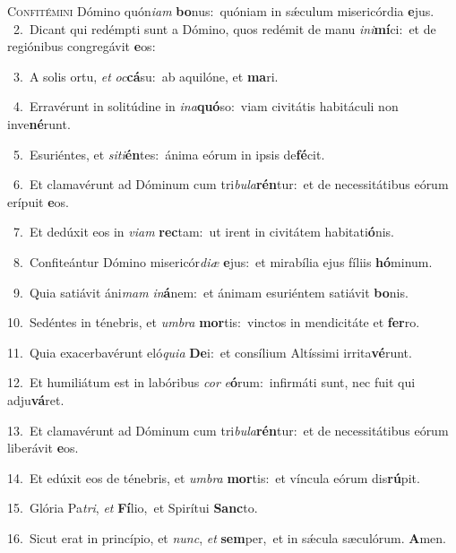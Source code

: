 \lettrine{\initial\textcolor{\initialcolor}{C}}{onfitémini} Dómino quón\-\textit{i}\-\textit{am} \textbf{bo}\-nus:~\star quóniam in sǽculum misericórdia \textbf{e}\-jus.\\
{\numbfont\textcolor{\numbcolor}{~2.}}~Dicant qui redémpti sunt a Dómino, quos redémit de manu \textit{in}\-\textit{i}\textbf{mí}ci:~\star et de regiónibus congregávit \textbf{e}\-os:\par
{\numbfont\textcolor{\numbcolor}{~3.}}~A solis ortu, \textit{et} \textit{oc}\-\textbf{cá}su:~\star ab aquilóne, et \textbf{ma}\-ri.\par
{\numbfont\textcolor{\numbcolor}{~4.}}~Erravérunt in solitúdine in \textit{in}\-\textit{a}\textbf{quó}so:~\star viam civitátis habitáculi non inve\-\textbf{né}\-runt.\par
{\numbfont\textcolor{\numbcolor}{~5.}}~Esuriéntes, et \textit{si}\-\textit{ti}\textbf{én}tes:~\star ánima eórum in ipsis de\-\textbf{fé}\-cit.\par
{\numbfont\textcolor{\numbcolor}{~6.}}~Et clamavérunt ad Dóminum cum tri\-\textit{bu}\-\textit{la}\textbf{rén}tur:~\star et de necessitátibus eórum erípuit \textbf{e}\-os.\par
{\numbfont\textcolor{\numbcolor}{~7.}}~Et dedúxit eos in \textit{vi}\-\textit{am} \textbf{rec}\-tam:~\star ut irent in civitátem habitati\-\textbf{ó}\-nis.\par
{\numbfont\textcolor{\numbcolor}{~8.}}~Confiteántur Dómino misericór\-\textit{di}\-\textit{æ} \textbf{e}\-jus:~\star et mirabília ejus fíliis \textbf{hó}\-minum.\par
{\numbfont\textcolor{\numbcolor}{~9.}}~Quia satiávit áni\textit{mam} \textit{in}\-\textbf{á}nem:~\star et ánimam esuriéntem satiávit \textbf{bo}\-nis.\par
{\numbfont\textcolor{\numbcolor}{10.}}~Sedéntes in ténebris, et \textit{um}\-\textit{bra} \textbf{mor}\-tis:~\star vinctos in mendicitáte et \textbf{fer}\-ro.\par
{\numbfont\textcolor{\numbcolor}{11.}}~Quia exacerbavérunt eló\-\textit{qui}\-\textit{a} \textbf{De}\-i:~\star et consílium Altíssimi irrita\-\textbf{vé}\-runt.\par
{\numbfont\textcolor{\numbcolor}{12.}}~Et humiliátum est in labóribus \textit{cor} \textit{e}\-\textbf{ó}rum:~\star infirmáti sunt, nec fuit qui adju\-\textbf{vá}\-ret.\par
{\numbfont\textcolor{\numbcolor}{13.}}~Et clamavérunt ad Dóminum cum tri\-\textit{bu}\-\textit{la}\textbf{rén}tur:~\star et de necessitátibus eórum liberávit \textbf{e}\-os.\par
{\numbfont\textcolor{\numbcolor}{14.}}~Et edúxit eos de ténebris, et \textit{um}\-\textit{bra} \textbf{mor}\-tis:~\star et víncula eórum dis\-\textbf{rú}\-pit.\par
{\numbfont\textcolor{\numbcolor}{15.}}~Glória Pa\-\textit{tri}\-, \textit{et} \textbf{Fí}\-lio,~\star et Spirítui \textbf{Sanc}\-to.\par
{\numbfont\textcolor{\numbcolor}{16.}}~Sicut erat in princípio, et \textit{nunc}\-, \textit{et} \textbf{sem}\-per,~\star et in sǽcula sæculórum. \textbf{A}\-men.\par
